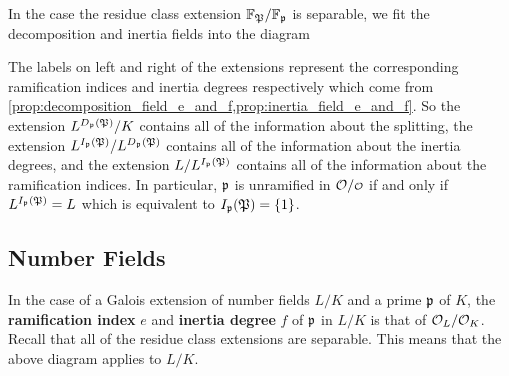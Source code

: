     In the case the residue class extension \(\mathbb{F}_{\mathfrak{P}}/\mathbb{F}_{\mathfrak{p}}\) is separable, we fit the decomposition and inertia fields into the diagram
    \begin{center}
    \end{center}
    The labels on left and right of the extensions represent the corresponding ramification indices and inertia degrees respectively which come from \cref{prop:decomposition_field_e_and_f,prop:inertia_field_e_and_f}. So the extension \(L^{D_{\mathfrak{p}}(\mathfrak{P})}/K\) contains all of the information about the splitting, the extension \(L^{I_{\mathfrak{p}}(\mathfrak{P})}/L^{D_{\mathfrak{p}}(\mathfrak{P})}\) contains all of the information about the inertia degrees, and the extension \(L/L^{I_{\mathfrak{p}}(\mathfrak{P})}\) contains all of the information about the ramification indices. In particular, \(\mathfrak{p}\) is unramified in \(\mc{O}/\smc{O}\) if and only if \(L^{I_{\mathfrak{p}}(\mathfrak{P})} = L\) which is equivalent to \(I_{\mathfrak{p}}(\mathfrak{P}) = \{1\}\).

    \subsection*{Number Fields}
      In the case of a Galois extension of number fields \(L/K\) and a prime \(\mathfrak{p}\) of \(K\), the \textbf{ramification index} \(e\) and \textbf{inertia degree} \(f\) of \(\mathfrak{p}\) in \(L/K\) is that of \(\mathcal{O}_{L}/\mathcal{O}_{K}\). Recall that all of the residue class extensions are separable. This means that the above diagram applies to \(L/K\).

